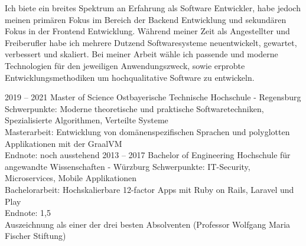 \documentclass[9pt]{../developercv} %
\begin{document}
\vspace{0.5cm}



\begin{minipage}[t]{0.4\textwidth} %
	\vspace{-\baselineskip} %
        Ich biete ein breites Spektrum an Erfahrung als Software Entwickler, habe jedoch meinen primären
        Fokus im Bereich der Backend Entwicklung und sekundären Fokus in der Frontend Entwicklung.
        Während meiner Zeit als Angestellter und Freiberufler habe ich mehrere Dutzend
        Softwaresysteme neuentwickelt, gewartet, verbessert und skaliert. Bei meiner Arbeit wähle ich
        passende und moderne Technologien für den jeweiligen Anwendungszweck, sowie erprobte Entwicklungsmethodiken
        um hochqualitative Software zu entwickeln.
\end{minipage}
\hfill %
\begin{minipage}[t]{0.55\textwidth} %
	\vspace{-\baselineskip} %
	\begin{barchart}{5.5}
	\end{barchart}
\end{minipage}



\begin{entrylist}
	\entry
		{2019 -- 2021}
		{Master of Science}
		{Ostbayerische Technische Hochschule - Regensburg}
		{Schwerpunkte: Moderne theoretische und praktische Softwaretechniken, Spezialisierte Algorithmen, Verteilte Systeme\\Masterarbeit: Entwicklung von domänenspezifischen Sprachen und polyglotten Applikationen mit der GraalVM\\Endnote: noch ausstehend}
	\entry
		{2013 -- 2017}
		{Bachelor of Engineering}
		{Hochschule für angewandte Wissenschaften - Würzburg}
		{Schwerpunkte: IT-Security, Microservices, Mobile Applikationen\\Bachelorarbeit: Hochskalierbare 12-factor Apps mit Ruby on Rails, Laravel und Play\\Endnote: 1,5\\Auszeichnung als einer der drei besten Absolventen (Professor Wolfgang Maria Fischer Stiftung)}
\end{entrylist}
\end{document}
